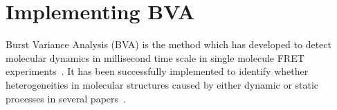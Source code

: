 \section{Implementing BVA}


Burst Variance Analysis (BVA) is the method which has developed to detect molecular dynamics in millisecond time scale in single molecule FRET experiments~\cite{Torella_2011}. It has been successfully implemented to identify whether heterogeneities in molecular structures caused by either dynamic or static processes in several papers~\cite{Torella_2011}\cite{Robb_2013}.